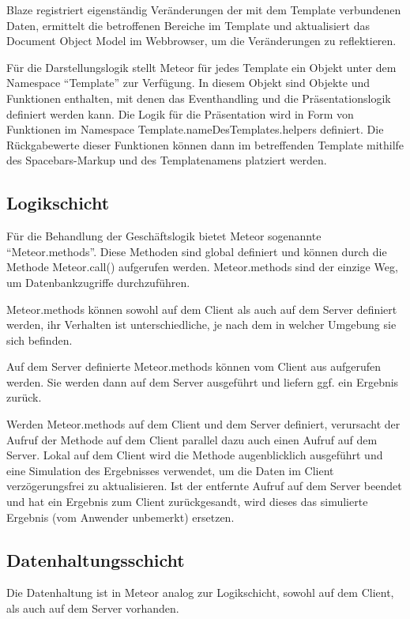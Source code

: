 Blaze registriert eigenständig Veränderungen der mit dem Template verbundenen
Daten, ermittelt die betroffenen Bereiche im Template und aktualisiert das
Document Object Model im Webbrowser, um die Veränderungen zu reflektieren.

Für die Darstellungslogik stellt Meteor für jedes Template ein Objekt
unter dem Namespace "`Template"' zur Verfügung. In diesem Objekt sind Objekte
und Funktionen enthalten, mit denen das Eventhandling und die Präsentationslogik
definiert werden kann. Die Logik für die Präsentation wird in Form von
Funktionen im Namespace Template.nameDesTemplates.helpers definiert.
Die Rückgabewerte dieser Funktionen können dann im betreffenden Template
mithilfe des Spacebars-Markup und des Templatenamens platziert werden.

\subsection{Logikschicht}

Für die Behandlung der Geschäftslogik bietet Meteor sogenannte
"`Meteor.methods"'. Diese Methoden sind global definiert und können durch die
Methode Meteor.call() aufgerufen werden. Meteor.methods sind der einzige Weg, um
Datenbankzugriffe durchzuführen.

Meteor.methods können sowohl auf dem Client als auch auf dem Server definiert
werden, ihr Verhalten ist unterschiedliche, je nach dem in welcher Umgebung sie
sich befinden.

Auf dem Server definierte Meteor.methods können vom Client aus aufgerufen
werden. Sie werden dann auf dem Server ausgeführt und liefern ggf. ein Ergebnis
zurück.

Werden Meteor.methods auf dem Client und dem Server definiert, verursacht der
Aufruf der  Methode auf dem Client parallel dazu auch einen Aufruf auf dem
Server. Lokal auf dem Client wird die Methode augenblicklich ausgeführt und eine
Simulation des Ergebnisses verwendet, um die Daten im Client verzögerungsfrei zu
aktualisieren. Ist der entfernte Aufruf auf dem Server beendet und hat ein
Ergebnis zum Client zurückgesandt, wird dieses das simulierte Ergebnis (vom
Anwender unbemerkt) ersetzen.

\subsection{Datenhaltungsschicht}

Die Datenhaltung ist in Meteor analog zur Logikschicht, sowohl auf dem Client,
als auch auf dem Server vorhanden.

